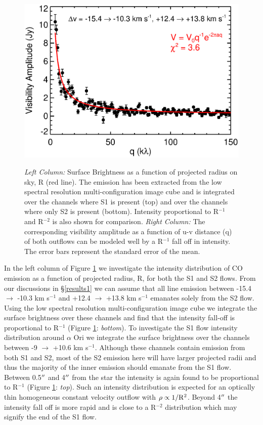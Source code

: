 \documentclass[iop]{emulateapj}
\begin{document}
\begin{figure}[hbt!]
{          \includegraphics[scale=0.50]{f17.eps}
          }
\\
\caption{\textit{Left Column:} Surface Brightness as a function of projected radius on sky, R (red line). The emission has been extracted from the low spectral resolution multi-configuration image cube and is integrated over the channels where S1 is present (top) and over the channels where only S2 is present (bottom). Intensity proportional to R${}^{-1}$ and R${}^{-2}$ is also shown for comparison. \textit{Right Column:} The corresponding visibility amplitude as a function of u-v distance (q) of both outflows can be modeled well by a R${}^{-1}$ fall off in intensity. The error bars represent the standard error of the mean.}
\label{fig:fig6}
\end{figure}

In the left column of Figure \ref{fig:fig6} we investigate the intensity distribution of CO emission as a function of projected radius, R, for both the S1 and S2 flows. From our discussions in \S \ref{results1} we can assume that all line emission between -15.4 $\rightarrow$ -10.3 km s${}^{-1}$ and +12.4 $\rightarrow$ +13.8 km s${}^{-1}$ emanates solely from the S2 flow. Using the low spectral resolution multi-configuration image cube we integrate the surface brightness over these channels and find that the intensity fall-off is proportional to R${}^{-1}$ (Figure \ref{fig:fig6}: \textit{bottom}). To investigate the S1 flow intensity distribution around $\alpha$ Ori we integrate the surface brightness over the channels between -9 $\rightarrow$ +10.6 km s${}^{-1}$. Although these channels contain emission from both S1 and S2, most of the S2 emission here will have larger projected radii and thus the majority of the inner emission should emanate from the S1 flow.  Between 0.5$\mbox{$^{\prime\prime}$}$ and 4$\mbox{$^{\prime\prime}$}$ from the star the intensity is again found to be proportional to R${}^{-1}$ (Figure \ref{fig:fig6}: \textit{top}). Such an intensity distribution is expected for an optically thin homogeneous constant velocity outflow with $\rho \propto 1/\rm{R^{2}}$. Beyond 4$\mbox{$^{\prime\prime}$}$ the intensity fall off is more rapid and is close to a R${}^{-2}$ distribution which may signify the end of the S1 flow.
\end{document}
